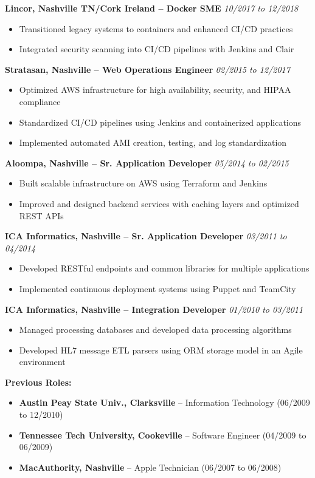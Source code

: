 \documentclass[a4paper,10pt]{article}
\begin{document}
\textbf{Lincor, Nashville TN/Cork Ireland – Docker SME} \hfill \textit{10/2017 to 12/2018}
\begin{itemize}
    \item Transitioned legacy systems to containers and enhanced CI/CD practices
    \item Integrated security scanning into CI/CD pipelines with Jenkins and Clair
\end{itemize}

\textbf{Stratasan, Nashville – Web Operations Engineer} \hfill \textit{02/2015 to 12/2017}
\begin{itemize}
    \item Optimized AWS infrastructure for high availability, security, and HIPAA compliance
    \item Standardized CI/CD pipelines using Jenkins and containerized applications
    \item Implemented automated AMI creation, testing, and log standardization
\end{itemize}

\textbf{Aloompa, Nashville – Sr. Application Developer} \hfill \textit{05/2014 to 02/2015}
\begin{itemize}
    \item Built scalable infrastructure on AWS using Terraform and Jenkins
    \item Improved and designed backend services with caching layers and optimized REST APIs
\end{itemize}

\textbf{ICA Informatics, Nashville – Sr. Application Developer} \hfill \textit{03/2011 to 04/2014}
\begin{itemize}
    \item Developed RESTful endpoints and common libraries for multiple applications
    \item Implemented continuous deployment systems using Puppet and TeamCity
\end{itemize}

\textbf{ICA Informatics, Nashville – Integration Developer} \hfill \textit{01/2010 to 03/2011}
\begin{itemize}
    \item Managed processing databases and developed data processing algorithms
    \item Developed HL7 message ETL parsers using ORM storage model in an Agile environment
\end{itemize}

\textbf{Previous Roles:}
\begin{itemize}
    \item \textbf{Austin Peay State Univ., Clarksville} – Information Technology (06/2009 to 12/2010)
    \item \textbf{Tennessee Tech University, Cookeville} – Software Engineer (04/2009 to 06/2009)
    \item \textbf{MacAuthority, Nashville} – Apple Technician (06/2007 to 06/2008)
\end{itemize}
\end{document}
